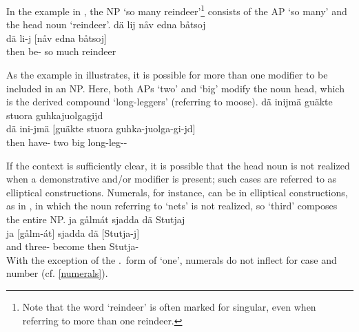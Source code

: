 In the example in , the NP  ‘so many reindeer’\footnote{Note that the word  ‘reindeer’ is often marked for singular, even when referring to more than one reindeer.} 
consists of the AP  ‘so many’ and the head noun  ‘reindeer’. 
\ea\label{NPstructureEx3}%
\glll	dä lij nåv edna båtsoj\\
	dä li-j [nåv edna {båtsoj]\subNP}\\
	then be- so much reindeer\BS{}\\\nopagebreak
{}	
\z

As the example in  illustrates, it is possible for more than one modifier to be included in an NP. Here, both APs  ‘two’ and  ‘big’ modify the noun head, which is the derived compound  ‘long-leggers’ (referring to moose). 
\ea\label{NPstructureEx4}%
\glll	dä inijmä guäkte stuora guhkajuolgagijd\\
	dä ini-jmä [guäkte stuora {guhka-juolga-gi-jd]\subNP}\\
	then have- two big long-leg--\\\nopagebreak
{}	
\z

If the context is sufficiently clear, it is possible that the head noun is not realized when a demonstrative and/or modifier is present; such cases are referred to as elliptical constructions. 
Numerals, for instance, can be in elliptical constructions, %
as in , in which the noun referring to ‘nets’ is not realized, so  ‘third’ composes the entire NP. %
\ea\label{NPstructureEx6}
\glll	ja gålmát sjadda dä Stutjaj\\
	ja {[gålm-át]\subNP{}} sjadda dä {[Stutja-j]\subNP{}}\\
	and three- become\BS{} then Stutja-\\\nopagebreak
{}	
\z
With the exception of the \ACCs.\SGs\ form of  ‘one’, numerals do not inflect for case and number (cf. \SEC\ref{numerals}). 

